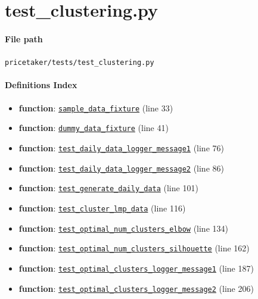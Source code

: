 \documentclass[11pt]{report}
\begin{document}
\section{test\_clustering.py}
\label{file:pricetaker-tests-test_clustering.py}
\paragraph{File path} \texttt{pricetaker/tests/test\_clustering.py}
\paragraph{Definitions Index}
\begin{itemize}[leftmargin=*]
  \item \textbf{function}: \hyperref[def:pricetaker-tests-test_clustering.py:sample_data_fixture:L33]{\texttt{sample\_data\_fixture}} (line 33)
  \item \textbf{function}: \hyperref[def:pricetaker-tests-test_clustering.py:dummy_data_fixture:L41]{\texttt{dummy\_data\_fixture}} (line 41)
  \item \textbf{function}: \hyperref[def:pricetaker-tests-test_clustering.py:test_daily_data_logger_message1:L76]{\texttt{test\_daily\_data\_logger\_message1}} (line 76)
  \item \textbf{function}: \hyperref[def:pricetaker-tests-test_clustering.py:test_daily_data_logger_message2:L86]{\texttt{test\_daily\_data\_logger\_message2}} (line 86)
  \item \textbf{function}: \hyperref[def:pricetaker-tests-test_clustering.py:test_generate_daily_data:L101]{\texttt{test\_generate\_daily\_data}} (line 101)
  \item \textbf{function}: \hyperref[def:pricetaker-tests-test_clustering.py:test_cluster_lmp_data:L116]{\texttt{test\_cluster\_lmp\_data}} (line 116)
  \item \textbf{function}: \hyperref[def:pricetaker-tests-test_clustering.py:test_optimal_num_clusters_elbow:L134]{\texttt{test\_optimal\_num\_clusters\_elbow}} (line 134)
  \item \textbf{function}: \hyperref[def:pricetaker-tests-test_clustering.py:test_optimal_num_clusters_silhouette:L162]{\texttt{test\_optimal\_num\_clusters\_silhouette}} (line 162)
  \item \textbf{function}: \hyperref[def:pricetaker-tests-test_clustering.py:test_optimal_clusters_logger_message1:L187]{\texttt{test\_optimal\_clusters\_logger\_message1}} (line 187)
  \item \textbf{function}: \hyperref[def:pricetaker-tests-test_clustering.py:test_optimal_clusters_logger_message2:L206]{\texttt{test\_optimal\_clusters\_logger\_message2}} (line 206)

\end{itemize}
\end{document}
